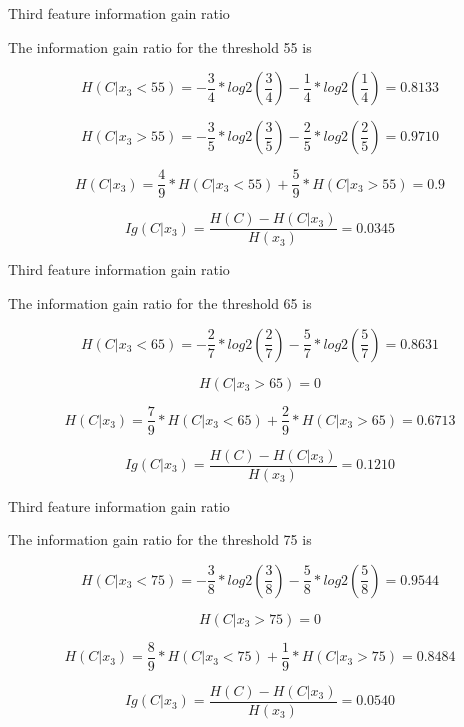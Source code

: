 \begin{frame}{Third feature information gain ratio}
	
	The information gain ratio for the threshold 55 is
	
	\[ 
		H(C|x_3 < 55)  = - \frac{3}{4} * log2\left(\frac{3}{4}\right) 
		- \frac{1}{4} * log2\left(\frac{1}{4}\right) = 0.8133
	\]
	
	\[ 
		H(C|x_3 > 55) = - \frac{3}{5} * log2\left(\frac{3}{5}\right) 
		- \frac{2}{5} * log2\left(\frac{2}{5}\right) = 0.9710
	\]
	
	\[ 
		H(C|x_3) = \frac{4}{9} * H(C|x_3 < 55) + \frac{5}{9} * H(C|x_3 > 55) 
		= 0.9
	\]
	
	\[ 
		Ig(C|x_3) = \frac{H(C) - H(C|x_3)}{H(x_3)} = 0.0345
	\]
\end{frame}

\begin{frame}{Third feature information gain ratio}
	
	The information gain ratio for the threshold 65 is
	
	\[ 
		H(C|x_3 < 65)  = - \frac{2}{7} * log2\left(\frac{2}{7}\right) 
		- \frac{5}{7} * log2\left(\frac{5}{7}\right) = 0.8631
	\]
	
	\[ 
		H(C|x_3 > 65) = 0
	\]
	
	\[ 
		H(C|x_3) = \frac{7}{9} * H(C|x_3 < 65) + \frac{2}{9} * H(C|x_3 > 65) 
		= 0.6713
	\]
	
	\[ 
		Ig(C|x_3) = \frac{H(C) - H(C|x_3)}{H(x_3)} = 0.1210
	\]
\end{frame}

\begin{frame}{Third feature information gain ratio}
	
	The information gain ratio for the threshold 75 is
	
	\[ 
		H(C|x_3 < 75)  = - \frac{3}{8} * log2\left(\frac{3}{8}\right) 
		- \frac{5}{8} * log2\left(\frac{5}{8}\right) = 0.9544
	\]
	
	\[ 
		H(C|x_3 > 75) = 0
	\]
	
	\[ 
		H(C|x_3) = \frac{8}{9} * H(C|x_3 < 75) + \frac{1}{9} * H(C|x_3 > 75) 
		= 0.8484
	\]
	
	\[ 
		Ig(C|x_3) = \frac{H(C) - H(C|x_3)}{H(x_3)} = 0.0540
	\]
\end{frame}

